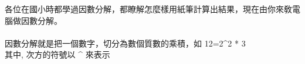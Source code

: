 各位在國小時都學過因數分解，都瞭解怎麼樣用紙筆計算出結果，現在由你來敎電腦做因數分解。\\
\\
因數分解就是把一個數字，切分為數個質數的乘積，如 12=2^2 * 3\\
其中, 次方的符號以 ^ 來表示